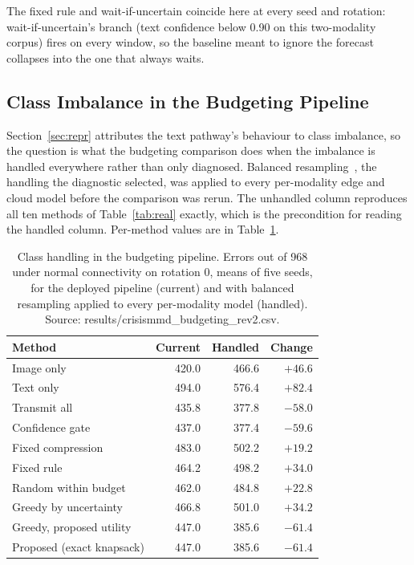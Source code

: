 \documentclass[conference,a4paper]{IEEEtran}
\newif\ifsubmission
\newcommand{\masteronly}[1]{\ifsubmission\else#1\fi}
\begin{document}
The fixed rule and wait-if-uncertain coincide here at every seed and rotation: wait-if-uncertain's branch (text confidence below 0.90 on this two-modality corpus) fires on every window, so the baseline meant to ignore the forecast collapses into the one that always waits.

\subsection{Class Imbalance in the Budgeting Pipeline}
\label{sec:realimbalance}
Section~\ref{sec:repr} attributes the text pathway's behaviour to class imbalance, so the question is what the budgeting comparison does when the imbalance is handled everywhere rather than only diagnosed. Balanced resampling~\cite{imbalance}, the handling the diagnostic selected, was applied to every per-modality edge and cloud model before the comparison was rerun. The unhandled column reproduces all ten methods of Table~\ref{tab:real} exactly, which is the precondition for reading the handled column.\masteronly{ Per-method values are in Table~\ref{tab:handled}.}

\masteronly{%
\begin{table}[t]
\caption{Class handling in the budgeting pipeline. Errors out of 968 under normal connectivity on rotation 0, means of five seeds, for the deployed pipeline (current) and with balanced resampling applied to every per-modality model (handled). Source: results/crisismmd\_budgeting\_rev2.csv.}
\label{tab:handled}
\centering\scriptsize\setlength{\tabcolsep}{5pt}
\begin{tabular}{@{}lrrr@{}}
\toprule
Method & Current & Handled & Change \\
\midrule
Image only & 420.0 & 466.6 & $+46.6$ \\
Text only & 494.0 & 576.4 & $+82.4$ \\
Transmit all & 435.8 & 377.8 & $-58.0$ \\
Confidence gate & 437.0 & 377.4 & $-59.6$ \\
Fixed compression & 483.0 & 502.2 & $+19.2$ \\
Fixed rule & 464.2 & 498.2 & $+34.0$ \\
Random within budget & 462.0 & 484.8 & $+22.8$ \\
Greedy by uncertainty & 466.8 & 501.0 & $+34.2$ \\
Greedy, proposed utility & 447.0 & 385.6 & $-61.4$ \\
Proposed (exact knapsack) & 447.0 & 385.6 & $-61.4$ \\
\bottomrule
\end{tabular}
\end{table}}%
\end{document}
